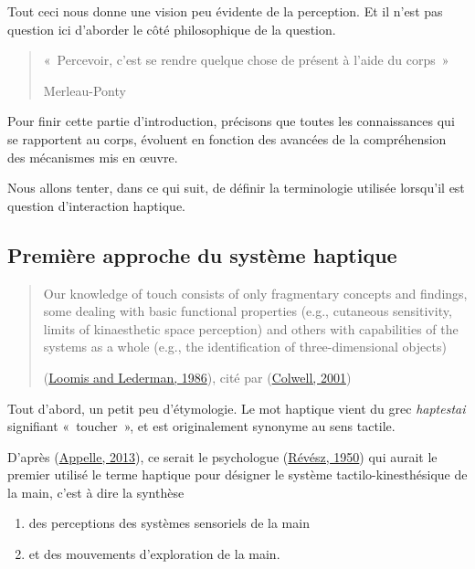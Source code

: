 \documentclass[
]{book}
\providecommand{\tightlist}{%
  \setlength{\itemsep}{0pt}\setlength{\parskip}{0pt}}
\begin{document}
Tout ceci nous donne une vision peu évidente de la perception. Et il n'est
pas question ici d'aborder le côté philosophique de la question.

\begin{quote}
«~Percevoir, c'est se rendre quelque chose de présent à l'aide du corps~»

Merleau-Ponty
\end{quote}

Pour finir cette partie d'introduction, précisons que toutes les
connaissances qui se rapportent au corps, évoluent en fonction des avancées
de la compréhension des mécanismes mis en œuvre.

Nous allons tenter, dans ce qui suit, de définir la terminologie utilisée
lorsqu'il est question d'interaction haptique.

\hypertarget{premiuxe8re-approche-du-systuxe8me-haptique}{%
\subsection{Première approche du système haptique}\label{premiuxe8re-approche-du-systuxe8me-haptique}}

\begin{quote}
Our knowledge of touch consists of only fragmentary concepts and findings,
some dealing with basic functional properties (e.g., cutaneous sensitivity,
limits of kinaesthetic space perception) and others with capabilities of
the systems as a whole (e.g., the identification of three-dimensional
objects)

(\protect\hyperlink{ref-loomis1986tactual}{Loomis and Lederman, 1986}), cité par
(\protect\hyperlink{ref-colwell2001non}{Colwell, 2001})
\end{quote}

Tout d'abord, un petit peu d'étymologie. Le mot haptique vient du grec
\emph{haptestai} signifiant «~toucher~», et
est originalement synonyme au sens tactile.

D'après (\protect\hyperlink{ref-appelle2013haptic}{Appelle, 2013}), ce serait le
psychologue (\protect\hyperlink{ref-revesz1950psychology}{Révész, 1950}) qui aurait le
premier utilisé le terme haptique pour désigner le système
tactilo-kinesthésique de la main, c'est à dire la synthèse

\begin{enumerate}
\def\labelenumi{\arabic{enumi}.}
\tightlist
\item
  des perceptions des systèmes sensoriels de la
  main
\item
  et des mouvements d'exploration de la main.
\end{enumerate}
\end{document}
